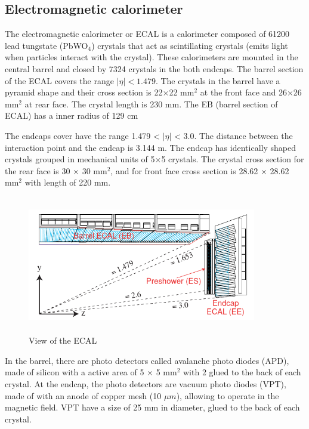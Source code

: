 \subsection{Electromagnetic calorimeter}

The electromagnetic calorimeter or ECAL is a calorimeter composed of 61200 lead tungstate (PbWO$_4$) crystals that act as scintillating crystals (emits light when particles interact with the crystal). These calorimeters are mounted in the central barrel and closed by 7324 crystals in the both endcaps. The barrel section of the ECAL covers the range $|\eta| < 1.479$. The crystals in the barrel have a pyramid shape and their cross section is 22$\times$22 mm$^2$ at the front face and 26$\times$26 mm$^2$ at rear face. The crystal length is 230 mm. The EB (barrel section of ECAL) has a inner radius of 129 cm\cite{cms-manual}

The endcaps cover have the range 1.479 < $|\eta|$ < 3.0. The distance between the interaction point and the endcap is 3.144 m. The endcap has identically shaped crystals grouped in
mechanical units of 5×5 crystals. The crystal cross section for the rear face is 30 $\times$ 30 mm$^2$, and for front face cross section is 28.62 $\times$ 28.62 mm$^2$ with length of 220 mm.

\begin{figure}[ht]
	\centering
	\includegraphics[width=10cm,height=6cm]{Chapter2/ecal.png}
	\caption[View of the ECAL]{View of the ECAL\cite{cms-manual}}\label{ecal}
\end{figure}
In the barrel, there are photo detectors called avalanche photo diodes (APD), made of silicon with a active area of 5 $\times$ 5 mm$^2$ with 2 glued to the back of each crystal. At the endcap, the photo detectors are vacuum photo diodes (VPT), made of with an anode of copper mesh (10 $\mu m$), allowing to operate in the magnetic field. VPT have a size of 25 mm in diameter, glued to the back of each crystal.

